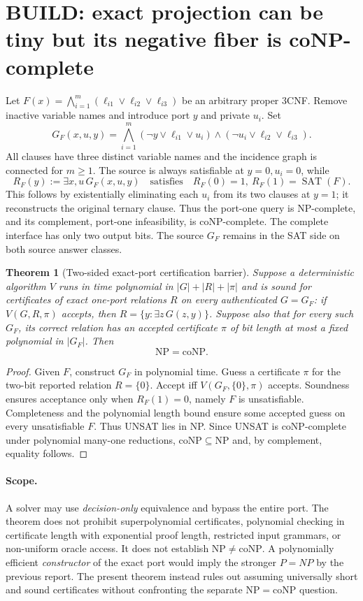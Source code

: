 \documentclass[11pt]{article}
\newtheorem{theorem}{Theorem}
\begin{document}
\section{BUILD: exact projection can be tiny but its negative fiber is coNP-complete}
Let $F(x)=\bigwedge_{i=1}^{m}(\ell_{i1}\vee\ell_{i2}\vee\ell_{i3})$ be an arbitrary proper 3CNF. Remove inactive variable names and introduce port $y$ and private $u_i$. Set
\[
G_F(x,u,y)=\bigwedge_{i=1}^{m}(\neg y\vee\ell_{i1}\vee u_i)\wedge(\neg u_i\vee\ell_{i2}\vee\ell_{i3}).
\]
All clauses have three distinct variable names and the incidence graph is connected for $m\ge1$. The source is always satisfiable at $y=0,u_i=0$, while
\[
R_F(y):=\exists x,u\,G_F(x,u,y)\quad\text{satisfies}\quad
\boxed{R_F(0)=1,\ R_F(1)=\operatorname{SAT}(F).}
\]
This follows by existentially eliminating each $u_i$ from its two clauses at $y=1$; it reconstructs the original ternary clause. Thus the port-one query is NP-complete, and its complement, port-one infeasibility, is coNP-complete. The complete interface has only two output bits. The source $G_F$ remains in the SAT side on both source answer classes.

\begin{theorem}[Two-sided exact-port certification barrier]\label{thm:certificate}
Suppose a deterministic algorithm $V$ runs in time polynomial in $|G|+|R|+|\pi|$ and is sound for certificates of \emph{exact} one-port relations $R$ on every authenticated $G=G_F$: if $V(G,R,\pi)$ accepts, then $R=\{y:\exists z\,G(z,y)\}$. Suppose also that for every such $G_F$, its correct relation has an accepted certificate $\pi$ of bit length at most a fixed polynomial in $|G_F|$. Then
\[\boxed{\mathrm{NP}=\mathrm{coNP}.}\]
\end{theorem}
\begin{proof}
Given $F$, construct $G_F$ in polynomial time. Guess a certificate $\pi$ for the two-bit reported relation $R=\{0\}$. Accept iff $V(G_F,\{0\},\pi)$ accepts. Soundness ensures acceptance only when $R_F(1)=0$, namely $F$ is unsatisfiable. Completeness and the polynomial length bound ensure some accepted guess on every unsatisfiable $F$. Thus UNSAT lies in NP. Since UNSAT is coNP-complete under polynomial many-one reductions, $\mathrm{coNP}\subseteq\mathrm{NP}$ and, by complement, equality follows.
\end{proof}

\paragraph{Scope.} A solver may use \emph{decision-only} equivalence and bypass the entire port. The theorem does not prohibit superpolynomial certificates, polynomial checking in certificate length with exponential proof length, restricted input grammars, or non-uniform oracle access. It does not establish $\mathrm{NP}\ne\mathrm{coNP}$. A polynomially efficient \emph{constructor} of the exact port would imply the stronger $P=NP$ by the previous report. The present theorem instead rules out assuming universally short and sound certificates without confronting the separate $\mathrm{NP}=\mathrm{coNP}$ question.
\end{document}
